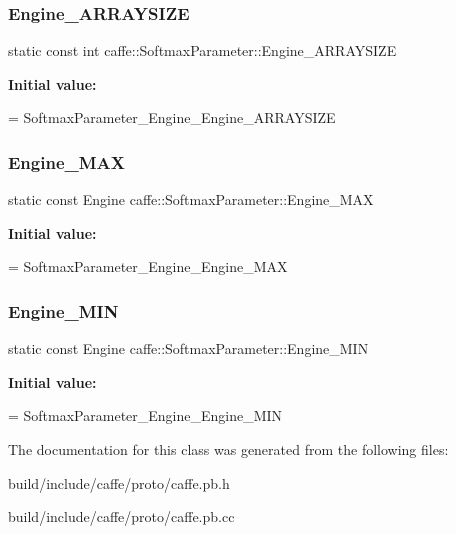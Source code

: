 \subsubsection{\texorpdfstring{Engine\+\_\+\+A\+R\+R\+A\+Y\+S\+I\+ZE}{Engine\_ARRAYSIZE}}
{\footnotesize\ttfamily static const int caffe\+::\+Softmax\+Parameter\+::\+Engine\+\_\+\+A\+R\+R\+A\+Y\+S\+I\+ZE\hspace{0.3cm}{\ttfamily [static]}}

{\bfseries Initial value\+:}
\begin{DoxyCode}
=
    SoftmaxParameter\_Engine\_Engine\_ARRAYSIZE
\end{DoxyCode}
\mbox{\label{classcaffe_1_1_softmax_parameter_abcb60b43050ed99a47e878c85df2422a}} 
\subsubsection{\texorpdfstring{Engine\+\_\+\+M\+AX}{Engine\_MAX}}
{\footnotesize\ttfamily static const Engine caffe\+::\+Softmax\+Parameter\+::\+Engine\+\_\+\+M\+AX\hspace{0.3cm}{\ttfamily [static]}}

{\bfseries Initial value\+:}
\begin{DoxyCode}
=
    SoftmaxParameter\_Engine\_Engine\_MAX
\end{DoxyCode}
\mbox{\label{classcaffe_1_1_softmax_parameter_a2d4194e10f8a341db886db4e434d6cb0}} 
\subsubsection{\texorpdfstring{Engine\+\_\+\+M\+IN}{Engine\_MIN}}
{\footnotesize\ttfamily static const Engine caffe\+::\+Softmax\+Parameter\+::\+Engine\+\_\+\+M\+IN\hspace{0.3cm}{\ttfamily [static]}}

{\bfseries Initial value\+:}
\begin{DoxyCode}
=
    SoftmaxParameter\_Engine\_Engine\_MIN
\end{DoxyCode}


The documentation for this class was generated from the following files\+:\begin{DoxyCompactItemize}
\item 
build/include/caffe/proto/caffe.\+pb.\+h\item 
build/include/caffe/proto/caffe.\+pb.\+cc\end{DoxyCompactItemize}
